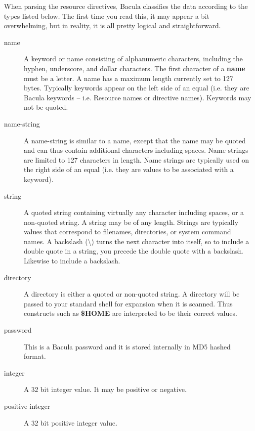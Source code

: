 When parsing the resource directives, Bacula classifies the data according to
the types listed below. The first time you read this, it may appear a bit
overwhelming, but in reality, it is all pretty logical and straightforward. 

\begin{description}

\item [name]
   A keyword or name consisting of alphanumeric characters, including the
hyphen, underscore, and dollar  characters. The first character of a {\bf
name} must be  a letter.  A name has a maximum length currently set to 127
bytes.  Typically keywords appear on the left side of an equal (i.e.  they are
Bacula keywords -- i.e. Resource names or  directive names). Keywords may not
be quoted.  

\item [name-string]
   A name-string is similar to a name,  except that the name may be quoted and
can thus contain  additional characters including spaces. Name strings  are
limited to 127 characters in length. Name strings  are typically used on the
right side of an equal (i.e.  they are values to be associated with a keyword).


\item [string]
   A quoted string containing virtually any  character including spaces, or a
non-quoted string. A  string may be of any length. Strings are typically
values  that correspond to filenames, directories, or system  command names. A
backslash (\textbackslash{}) turns the next character into  itself, so to
include a double quote in a string, you precede the  double quote with a
backslash. Likewise to include a backslash. 

\item [directory]
   A directory is either a quoted or  non-quoted string. A directory will be
passed to your  standard shell for expansion when it is scanned. Thus 
constructs such as {\bf \$HOME} are interpreted to be  their correct values. 

\item [password]
   This is a Bacula password and it is stored internally in MD5 hashed format. 

\item [integer]
   A 32 bit integer value. It may be positive or negative. 

\item [positive integer]
   A 32 bit positive integer value. 


\end{description}
